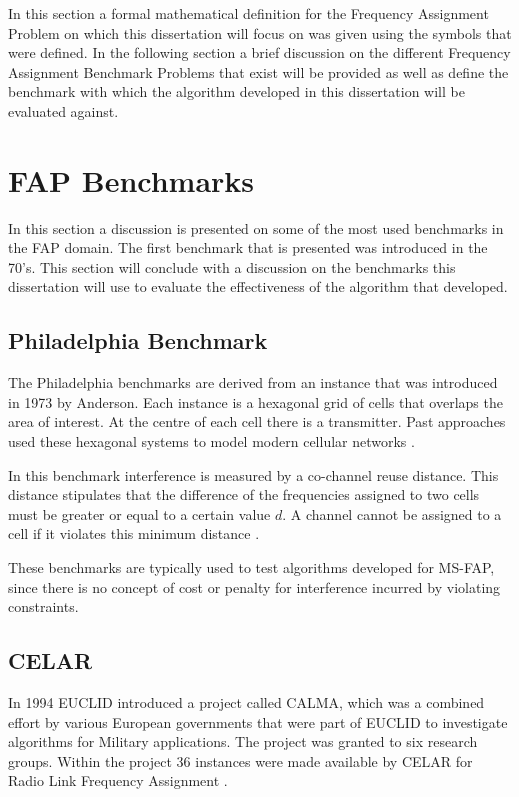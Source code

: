 In this section a formal mathematical definition for the Frequency Assignment Problem on which this dissertation will focus on was given using the symbols that were defined. In the following section a brief discussion on the different Frequency Assignment Benchmark Problems that exist will be provided as well as define the benchmark with which the algorithm developed in this dissertation will be evaluated against.
\section{FAP Benchmarks}
\label{sec:FAPBenchmarks}
In this section a discussion is presented on some of the most used benchmarks in the FAP domain. The first benchmark that is presented was introduced in the 70's. This section will conclude with a discussion on the benchmarks this dissertation will use to evaluate the effectiveness of the algorithm that developed.
\subsection{Philadelphia Benchmark}
The Philadelphia benchmarks are derived from an instance that was introduced in 1973 by Anderson. Each instance is a hexagonal grid of cells that overlaps the area of interest. At the centre of each cell there is a transmitter. Past approaches used these hexagonal systems to model modern cellular networks \cite{Karen2004,ExactMIFAP}.

In this benchmark interference is measured by a co-channel reuse distance. This distance stipulates that the difference of the frequencies  assigned to two cells must be greater or equal to a certain value $d$. A channel cannot be assigned to a cell if it violates this minimum distance \cite{Karen2004,ExactMIFAP}.

These benchmarks are typically used to test algorithms developed for MS-FAP, since there is no concept of cost or penalty for interference incurred by violating constraints.
\subsection{CELAR}
In 1994 EUCLID introduced a project called CALMA, which was a combined effort by various European governments that were part of EUCLID to investigate algorithms for Military applications. The project was granted to six research groups. Within the project 36 instances were made available by CELAR for Radio Link Frequency Assignment \cite{Karen2004,DynamicFAP}.

